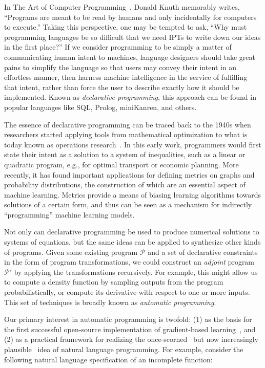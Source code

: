 \documentclass[10pt]{article}
\begin{document}
In The Art of Computer Programming~\cite{knuth1997art}, Donald Knuth memorably writes, ``Programs are meant to be read by humans and only incidentally for computers to execute.'' Taking this perspective, one may be tempted to ask, ``Why must programming languages be so difficult that we need IPTs to write down our ideas in the first place?'' If we consider programming to be simply a matter of communicating human intent to machines, language designers should take great pains to simplify the language so that users may convey their intent in an effortless manner, then harness machine intelligence in the service of fulfilling that intent, rather than force the user to describe exactly how it should be implemented. Known as \textit{declarative programming}, this approach can be found in popular languages like SQL, Prolog, miniKanren, and others.

The essence of declarative programming can be traced back to the 1940s when researchers started applying tools from mathematical optimization to what is today known as operations research~\cite{kantorovich1960mathematical}. In this early work, programmers would first state their intent as a solution to a system of inequalities, such as a linear or quadratic program, e.g., for optimal transport or economic planning. More recently, it has found important applications for defining metrics on graphs and probability distributions, the construction of which are an essential aspect of machine learning. Metrics provide a means of biasing learning algorithms towards solutions of a certain form, and thus can be seen as a mechanism for indirectly ``programming'' machine learning models.

Not only can declarative programming be used to produce numerical solutions to systems of equations, but the same ideas can be applied to synthesize other kinds of programs. Given some existing program $\mathcal P$ and a set of declarative constraints in the form of program transformations, we could construct an \textit{adjoint} program $\mathcal P'$ by applying the transformations recursively. For example, this might allow us to compute a density function by sampling outputs from the program probabilistically, or compute its derivative with respect to one or more inputs. This set of techniques is broadly known as \textit{automatic programming}.

Our primary interest in automatic programming is twofold: (1) as the basis for the first successful open-source implementation of gradient-based learning~\cite{baydin2018automatic}, and (2) as a practical framework for realizing the once-scorned~\cite{dijkstra1979foolishness} but now increasingly plausible~\cite{chen2021evaluating} idea of natural language programming. For example, consider the following natural language specification of an incomplete function:
\end{document}
